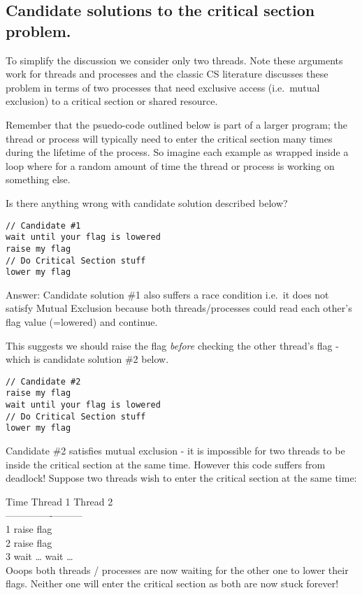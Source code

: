 \subsection{Candidate solutions to the critical section
problem.}\label{candidate-solutions-to-the-critical-section-problem.}

To simplify the discussion we consider only two threads. Note these
arguments work for threads and processes and the classic CS literature
discusses these problem in terms of two processes that need exclusive
access (i.e.~mutual exclusion) to a critical section or shared resource.

Remember that the psuedo-code outlined below is part of a larger
program; the thread or process will typically need to enter the critical
section many times during the lifetime of the process. So imagine each
example as wrapped inside a loop where for a random amount of time the
thread or process is working on something else.

Is there anything wrong with candidate solution described below?

\begin{verbatim}
// Candidate #1
wait until your flag is lowered
raise my flag
// Do Critical Section stuff
lower my flag 
\end{verbatim}

Answer: Candidate solution \#1 also suffers a race condition i.e.~it
does not satisfy Mutual Exclusion because both threads/processes could
read each other's flag value (=lowered) and continue.

This suggests we should raise the flag \emph{before} checking the other
thread's flag - which is candidate solution \#2 below.

\begin{verbatim}
// Candidate #2
raise my flag
wait until your flag is lowered
// Do Critical Section stuff
lower my flag 
\end{verbatim}

Candidate \#2 satisfies mutual exclusion - it is impossible for two
threads to be inside the critical section at the same time. However this
code suffers from deadlock! Suppose two threads wish to enter the
critical section at the same time:

Time \textbar{} Thread 1 \textbar{} Thread
2\\-----\textbar{}----------\textbar{}---------\\1 \textbar{} raise
flag\\2 \textbar{} \textbar{} raise flag\\3 \textbar{} wait \ldots{}
\textbar{} wait \ldots{}\\Ooops both threads / processes are now waiting
for the other one to lower their flags. Neither one will enter the
critical section as both are now stuck forever!

